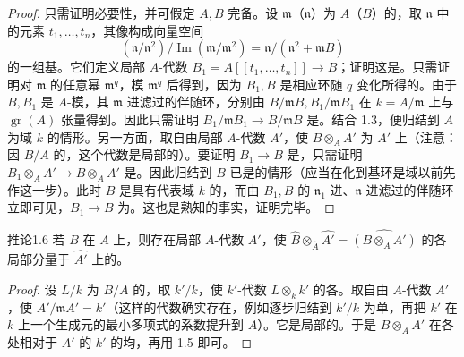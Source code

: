 \begin{proof}
只需证明必要性，并可假定 $A,B$ 完备。设 $\mathfrak m$（$\mathfrak n$）为 $A$（$B$）的，取 $\mathfrak n$ 中的元素 $t_1,\ldots,t_n$，其像构成向量空间
\[(\mathfrak n/\mathfrak n^2)/\operatorname{Im}(\mathfrak m/\mathfrak m^2)=\mathfrak n/(\mathfrak n^2+\mathfrak mB)\]
的一组基。它们定义局部 $A$-代数 $B_1=A[[t_1,\ldots,t_n]]\to B$；证明这是。只需证明对 $\mathfrak m$ 的任意幂 $\mathfrak m^q$，模 $\mathfrak m^q$ 后得到，因为 $B_1,B$ 是相应环随 $q$ 变化所得的。由于 $B,B_1$ 是 $A$-模，其 $\mathfrak m$ 进滤过的伴随环，分别由 $B/\mathfrak mB,B_1/\mathfrak mB_1$ 在 $k=A/\mathfrak m$ 上与 $\operatorname{gr}(A)$ 张量得到。因此只需证明 $B_1/\mathfrak mB_1\to B/\mathfrak mB$ 是。结合 1.3，便归结到 $A$ 为域 $k$ 的情形。另一方面，取自由局部 $A$-代数 $A'$，使 $B\otimes_A A'$ 为 $A'$ 上（注意：因 $B/A$ 的，这个代数是局部的）。要证明 $B_1\to B$ 是，只需证明 $B_1\otimes_A A'\to B\otimes_A A'$ 是。因此归结到 $B$ 已是的情形（应当在化到基环是域以前先作这一步）。此时 $B$ 是具有代表域 $k$ 的，而由 $B_1,B$ 的 $\mathfrak n_1$ 进、$\mathfrak n$ 进滤过的伴随环立即可见，$B_1\to B$ 为。这也是熟知的事实，证明完毕。
\end{proof}
\begin{SGAresult}{推论}{1.6}
若 $B$ 在 $A$ 上，则存在局部 $A$-代数 $A'$，使 $\widehat B\otimes_{\widehat A}\widehat {A'}=\widehat{(B\otimes_A A')}$ 的各局部分量于 $\widehat {A'}$ 上的。
\end{SGAresult}
\begin{proof}
设 $L/k$ 为 $B/A$ 的，取 $k'/k$，使 $k'$-代数 $L\otimes_k k'$ 的各。取自由 $A$-代数 $A'$，使 $A'/\mathfrak mA'=k'$（这样的代数确实存在，例如逐步归结到 $k'/k$ 为单，再把 $k'$ 在 $k$ 上一个生成元的最小多项式的系数提升到 $A$）。它是局部的。于是 $B\otimes_A A'$ 在各处相对于 $A'$ 的 $k'$ 的均，再用 1.5 即可。
\end{proof}
